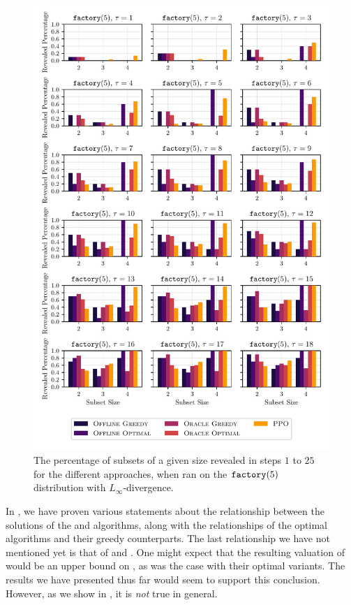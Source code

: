 \begin{figure}[t!]
  \centering
	\includegraphics[width=\textwidth]{figures/linf_norm_predictible_factory5_coalition_bar_sizes.pdf}
	\caption{ The percentage of subsets of a given size revealed in steps $1 $ to $ 25 $ for the different approaches, when ran on the $\factory[5]$ distribution with $L_\infty$-divergence.}
	\label{fig:factory_linf_coals}
\end{figure}


In , we have proven various statements about the relationship between the solutions of the \algFO{} and \algRO{} algorithms, along with the relationships of the optimal algorithms and their greedy counterparts.
The last relationship we have not mentioned yet is that of \algFG{} and \algRG{}.
One might expect that the resulting valuation of \algFG{} would be an upper bound on \algRG{}, as was the case with their optimal variants.
The results we have presented thus far would seem to support this conclusion.
However, as we show in , it is \emph{not} true in general.

